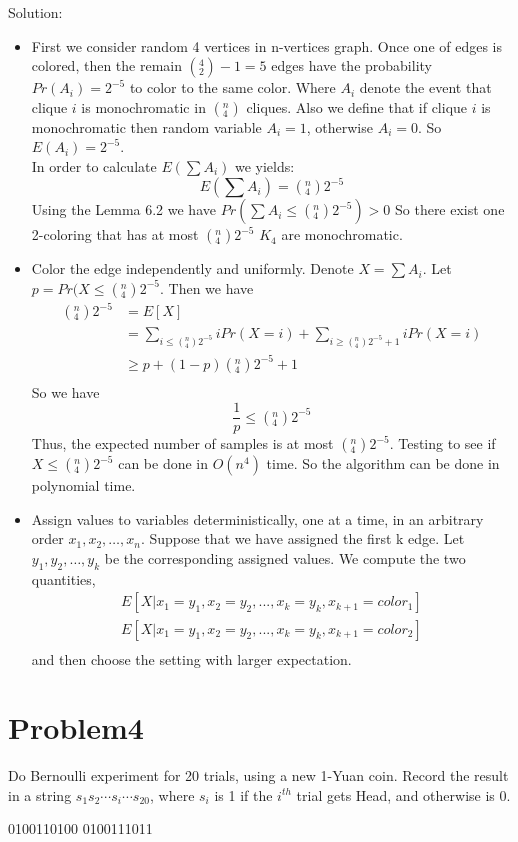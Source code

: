 \documentclass[12pt]{article}
\begin{document}
Solution:\\
\begin{itemize}
\item
First we consider random 4 vertices in n-vertices graph. Once one of edges is colored, then the remain $({}_2^4)-1 = 5$ edges have the probability $Pr(A_i) = 2^{-5}$ to color to the same color. Where $A_i$ denote the event that clique $i$ is monochromatic in $({}_4^n)$ cliques. Also we define that if clique $i$ is monochromatic then random variable $A_i=1$, otherwise $A_i=0$. So $E(A_i) = 2^{-5}$.\\
In order to calculate $E(\sum A_i)$ we yields:
\begin{equation}
    E(\sum A_i) = ({}_4^n)2^{-5}
\end{equation}
Using the Lemma 6.2 we have $Pr(\sum A_i \le ({}_4^n)2^{-5})>0 $
So there exist one 2-coloring that has at most $({}_4^n)2^{-5}$ $K_4$ are monochromatic.

\item
Color the edge independently and uniformly. Denote $X = \sum A_i$. Let $p = Pr(X \le ({}_4^n)2^{-5}$. Then we have
\begin{equation}
    \begin{split}
    ({}_4^n)2^{-5} &= E[X] \\
    &= \sum_{i \le ({}_4^n)2^{-5}} i Pr(X=i) + \sum_{i \ge ({}_4^n)2^{-5}+1} i Pr(X=i) \\
    &\ge p + (1-p) ({}_4^n)2^{-5}+1 \\
    \end{split}
\end{equation}
So we have
\begin{equation}
    \frac{1}{p} \le ({}_4^n)2^{-5}
\end{equation}
Thus, the expected number of samples is at most $({}_4^n)2^{-5}$. Testing to see if $X \le ({}_4^n)2^{-5}$ can be done in $O(n^4)$ time. So the algorithm can be done in polynomial time.
\item
Assign values to variables deterministically, one at a time, in an arbitrary order
$x_1, x_2, \dots , x_n$. Suppose that we have assigned the first k edge. Let $y_1, y_2, \dots , y_k$
be the corresponding assigned values. We compute the two quantities,
\begin{equation}
    \begin{split}
    E[X | x_1 = y_1, x_2 = y_2, . . . , x_k = y_k, x_{k+1} = color_1 ]\\
    E[X | x_1 = y_1, x_2 = y_2, . . . , x_k = y_k, x_{k+1} = color_2 ]\\
    \end{split}
\end{equation}
and then choose the setting with larger expectation.
\end{itemize}
\section{Problem4}
Do Bernoulli experiment for 20 trials, using a new 1-Yuan coin. Record the result in a
string $s_1s_2 \cdots s_i \cdots s_{20}$, where $s_i$ is 1 if the $i^{th}$ trial gets Head, and otherwise is 0.

0100110100 0100111011
\end{document}
